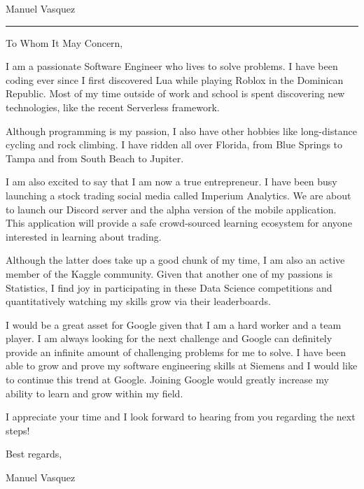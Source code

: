 \documentclass{article}
\newcommand{\position}{I am writing to apply for the \_ position.}
\newcommand{\company}{Google}
\newcommand{\name}{Manuel Vasquez}
\begin{document}
\begin{minipage}[t]{.69\linewidth}
    \begin{center}
        \Huge \name
    \end{center}
    \vspace*{1.89cm}
    \hrule
    \vspace*{.49cm}

    To Whom It May Concern,
    \vspace*{.49cm}

    \raggedright


    I am a passionate Software Engineer who lives to solve problems. I have been coding ever since I first discovered Lua while playing Roblox in the Dominican Republic. Most of my time outside of work and school is spent discovering new technologies, like the recent Serverless framework.
    \vspace*{.49cm}

    Although programming is my passion, I also have other hobbies like long-distance cycling and rock climbing. I have ridden all over Florida, from Blue Springs to Tampa and from South Beach to Jupiter.
    \vspace*{.49cm}

    I am also excited to say that I am now a true entrepreneur. I have been busy launching a stock trading social media called Imperium Analytics. We are about to launch our Discord server and the alpha version of the mobile application. This application will provide a safe crowd-sourced learning ecosystem for anyone interested in learning about trading.
    \vspace*{.49cm}

    Although the latter does take up a good chunk of my time, I am also an active member of the Kaggle community. Given that another one of my passions is Statistics, I find joy in participating in these Data Science competitions and quantitatively watching my skills grow via their leaderboards.
    \vspace*{.49cm}

    I would be a great asset for \company $ $ given that I am a hard worker and a team player. I am always looking for the next challenge and \company $ $ can definitely provide an infinite amount of challenging problems for me to solve. I have been able to grow and prove my software engineering skills at Siemens and I would like to continue this trend at \company. Joining \company $ $ would greatly increase my ability to learn and grow within my field. 
    \vspace*{.49cm}

    I appreciate your time and I look forward to hearing from you regarding the next steps!
    \vspace*{1cm}

    Best regards,
    \vspace*{.49cm}

    \name
\end{minipage}
\end{document}
